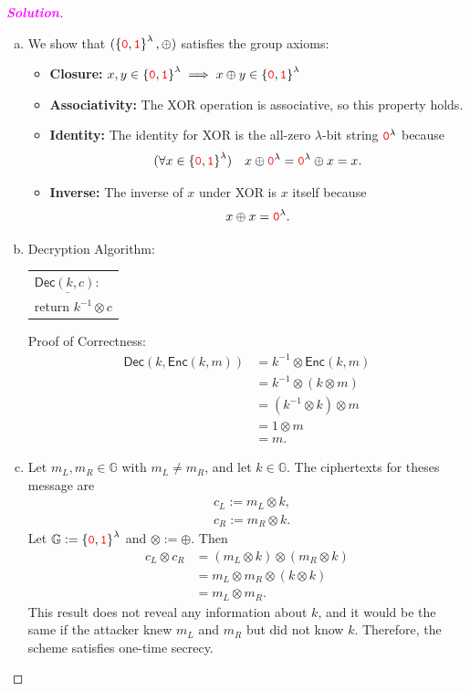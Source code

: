 \documentclass[12pt,openany]{book}
\theoremstyle{definition}
\newcommand{\G}{\mathbb{G}}
\newcommand{\inv}[1]{#1^{-1}}
\newcommand{\sol}{\textcolor{magenta}{\bf Solution}}
\newcommand{\Enc}{\mathsf{Enc}}
\newcommand{\Dec}{\mathsf{Dec}}
\newcommand{\zero}{\textcolor{red}{\texttt{0}}}
\newcommand{\one}{\textcolor{red}{\texttt{1}}}
\newcommand{\tab}{\hspace{12pt}}
\newcommand{\xor}{\oplus}
\newcommand{\binaryfield}{\set{\zero,\one}}
\begin{document}
	\begin{proof}[\sol]
		\begin{enumerate}[(a)]
			\item We show that \((\binaryfield^\lambda,\xor)\) satisfies the group axioms:
			\begin{itemize}
				\item[] \textbf{Closure:} \(x,y\in\binaryfield^\lambda\implies x\xor y\in\binaryfield^\lambda\)
				\item[] \textbf{Associativity:} The XOR operation is associative, so this property holds.
				\item[] \textbf{Identity:} The identity for XOR is the all-zero \(\lambda\)-bit string \(\zero^\lambda\) because \[
				(\forall x\in\binaryfield^\lambda)\quad x\xor\zero^\lambda=\zero^\lambda\xor x= x.
				\]
				\item[] \textbf{Inverse:} The inverse of $x$ under XOR is $x$ itself because \[
				x\xor x=\zero^\lambda.
				\]
			\end{itemize}
			\vspace{4pt}
			\item Decryption Algorithm: \begin{center}
				\begin{tabular}{l}
					\(\underline{\Dec(k,c):}\) \\ \tab return \(\inv{k}\otimes c\)
				\end{tabular}
			\end{center}
			Proof of Correctness: \begin{align*}
				\Dec(k,\Enc(k,m))&=\inv{k}\otimes\Enc(k,m)\\
				&=\inv{k}\otimes(k\otimes m)\\
				&=(\inv{k}\otimes k)\otimes m\\
				&=1\otimes m\\
				&=m.
			\end{align*}
			\item Let $m_L,m_R\in\G$ with $m_L\neq m_R$, and let $k\in\G$. The ciphertexts for theses message are \begin{align*}
				&c_L:=m_L\otimes k,\\
				&c_R:=m_R\otimes k.
			\end{align*} Let $\G:=\binaryfield^\lambda$ and $\otimes:=\xor$. Then \begin{align*}
				c_L\otimes c_R&=(m_L\otimes k)\otimes(m_R\otimes k)\\
				&=m_L\otimes m_R\otimes(k\otimes k)\\
				&=m_L\otimes m_R.
			\end{align*} This result does not reveal any information about $k$, and it would be the same if the attacker knew $m_L$ and $m_R$ but did not know $k$. Therefore, the scheme satisfies one-time secrecy.
			

\end{enumerate}
\end{proof}
\end{document}
